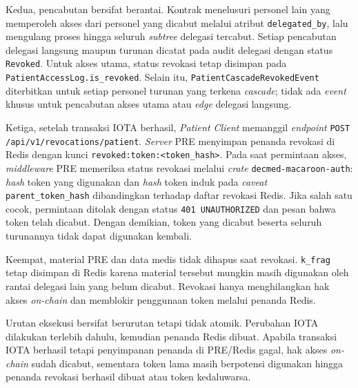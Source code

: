 Kedua, pencabutan bersifat berantai. Kontrak menelusuri personel lain yang memperoleh akses dari personel yang dicabut melalui atribut \texttt{delegated\_by}, lalu mengulang proses hingga seluruh \textit{subtree} delegasi tercabut. Setiap pencabutan delegasi langsung maupun turunan dicatat pada audit delegasi dengan status \texttt{Revoked}. Untuk akses utama, status revokasi tetap disimpan pada \texttt{PatientAccessLog.is\_revoked}. Selain itu, \texttt{PatientCascadeRevokedEvent} diterbitkan untuk setiap personel turunan yang terkena \textit{cascade}; tidak ada \textit{event} khusus untuk pencabutan akses utama atau \textit{edge} delegasi langsung.

Ketiga, setelah transaksi IOTA berhasil, \textit{Patient Client} memanggil \textit{endpoint} \texttt{POST /api/v1/revocations/patient}. \textit{Server} PRE menyimpan penanda revokasi di Redis dengan kunci \verb|revoked:token:<token_hash>|. Pada saat permintaan akses, \textit{middleware} PRE memeriksa status revokasi melalui \textit{crate} \texttt{decmed-macaroon-auth}: \textit{hash} token yang digunakan dan \textit{hash} token induk pada \textit{caveat} \texttt{parent\_token\_hash} dibandingkan terhadap daftar revokasi Redis. Jika salah satu cocok, permintaan ditolak dengan status \texttt{401 UNAUTHORIZED} dan pesan bahwa token telah dicabut. Dengan demikian, token yang dicabut beserta seluruh turunannya tidak dapat digunakan kembali.

Keempat, material PRE dan data medis tidak dihapus saat revokasi. \texttt{k\_frag} tetap disimpan di Redis karena material tersebut mungkin masih digunakan oleh rantai delegasi lain yang belum dicabut. Revokasi hanya menghilangkan hak akses \textit{on-chain} dan memblokir penggunaan token melalui penanda Redis.

Urutan eksekusi bersifat berurutan tetapi tidak atomik. Perubahan IOTA dilakukan terlebih dahulu, kemudian penanda Redis dibuat. Apabila transaksi IOTA berhasil tetapi penyimpanan penanda di PRE/Redis gagal, hak akses \textit{on-chain} sudah dicabut, sementara token lama masih berpotensi digunakan hingga penanda revokasi berhasil dibuat atau token kedaluwarsa.